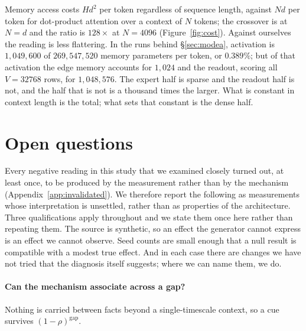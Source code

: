\documentclass[11pt,a4paper]{article}
\begin{document}
Memory access costs $Hd^2$ per token regardless of sequence length, against
$Nd$ per token for dot-product attention over a context of $N$ tokens; the
crossover is at $N=d$ and the ratio is $128\times$ at $N=4096$
(Figure~\ref{fig:cost}). Against ourselves the reading is less flattering. In
the runs behind \S\ref{sec:modea}, activation is $1{,}049{,}600$ of
$269{,}547{,}520$ memory parameters per token, or $0.389\%$; but of that
activation the edge memory accounts for $1{,}024$ and the readout, scoring all
$V=32768$ rows, for $1{,}048{,}576$. The expert half is sparse and the readout
half is not, and the half that is not is a thousand times the larger. What is
constant in context length is the total; what sets that constant is the dense
half.

\section{Open questions}
\label{sec:open}

Every negative reading in this study that we examined closely turned out, at
least once, to be produced by the measurement rather than by the mechanism
(Appendix~\ref{app:invalidated}). We therefore report the following as
measurements whose interpretation is unsettled, rather than as properties of
the architecture. Three qualifications apply throughout and we state them once
here rather than repeating them. The source is synthetic, so an effect the
generator cannot express is an effect we cannot observe. Seed counts are small
enough that a null result is compatible with a modest true effect. And in each
case there are changes we have not tried that the diagnosis itself suggests;
where we can name them, we do.
\paragraph{Can the mechanism associate across a gap?}
\label{sec:longrange}

Nothing is carried between facts beyond a single-timescale context, so a cue
survives $(1-\rho)^{\text{gap}}$.
\end{document}
